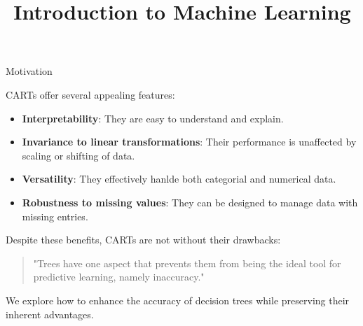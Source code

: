 \documentclass[11pt,compress,t,notes=noshow, xcolor=table]{beamer}
\title{Introduction to Machine Learning}
\institute{\href{https://compstat-lmu.github.io/lecture_i2ml/}{compstat-lmu.github.io/lecture\_i2ml}}
\date{}
\begin{document}
\sloppy


\begin{vbframe}{Motivation}

CARTs offer several appealing features:

\begin{itemize}
  \item \textbf{Interpretability}: They are easy to understand and explain.
  \item \textbf{Invariance to linear transformations}: Their performance is unaffected by scaling or shifting of data.
  \item \textbf{Versatility}: They effectively hanlde both categorial and numerical data.
  \item \textbf{Robustness to missing values}: They can be designed to manage data with missing entries.
\end{itemize}

Despite these benefits, CARTs are not without their drawbacks:

\begin{quotation}
"Trees have one aspect that prevents them from being the ideal tool for predictive learning, namely inaccuracy."
\end{quotation}


We explore how to enhance the accuracy of decision trees while preserving their inherent advantages.

\end{vbframe}
\end{document}
